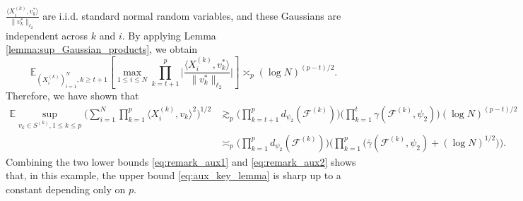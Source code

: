 \documentclass[numbers,webpdf,imaiai]{ima-authoring-template}
\theoremstyle{thmstyletwo}%
\numberwithin{equation}{section}
\numberwithin{equation}{section}
\newcommand{\F}{\mathcal{F}}
\newcommand{\E}{\mathbb{E}}
\begin{document}
\begin{appendix}
$\frac{\langle X_i^{(k)},v^*_k\rangle}{\|v^*_k\|_{\ell_2}}$ are i.i.d. standard normal random variables, and these Gaussians are independent across $k$ and $i$. By applying Lemma \ref{lemma:sup_Gaussian_products}, we obtain
\[
\E_{(X^{(k)}_i)_{i=1}^{N},k\ge t+1}  \left[\max_{1\le i\le N} \prod_{k=t+1}^{p} \bigg| \frac{\langle X_i^{(k)},v^*_k\rangle}{\|v^*_k\|_{\ell_2}}\bigg|\right]\asymp_p (\log N)^{(p-t)/2}.
\]
Therefore, we have shown that
\begin{align}\label{eq:remark_aux2}
\E \sup_{v_k\in S^{(k)},1\le k\le p} \bigg(\sum_{i=1}^{N}\prod_{k=1}^{p}\langle X_i^{(k)},v_k \rangle^2 \bigg)^{1/2} &\gtrsim_p \bigg(\prod_{k=t+1}^{p}d_{\psi_2}(\F^{(k)})\bigg) \bigg(\prod_{k=1}^{t}\gamma(\F^{(k)},\psi_2) \bigg)(\log N)^{(p-t)/2}\nonumber\\
&\asymp_p \bigg(\prod_{k=1}^{p} d_{\psi_2}(\F^{(k)})\bigg)  \bigg(\prod_{k=1}^{p} \Big(\bar{\gamma}(\F^{(k)},\psi_2)+(\log N)^{1/2}\Big)\bigg).
\end{align}
Combining the two lower bounds \eqref{eq:remark_aux1} and \eqref{eq:remark_aux2} shows that, in this example, the upper bound \eqref{eq:aux_key_lemma} is sharp up to a constant depending only on $p$.


\end{appendix}
\end{document}
